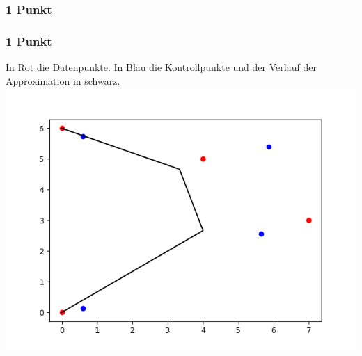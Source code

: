 \subsubsection{1 Punkt}
\begin{center}
\end{center}
\subsubsection{1 Punkt}
In Rot die Datenpunkte.
In Blau die Kontrollpunkte
und der Verlauf der Approximation in schwarz.
\includegraphics[width=\textwidth]{3d}

